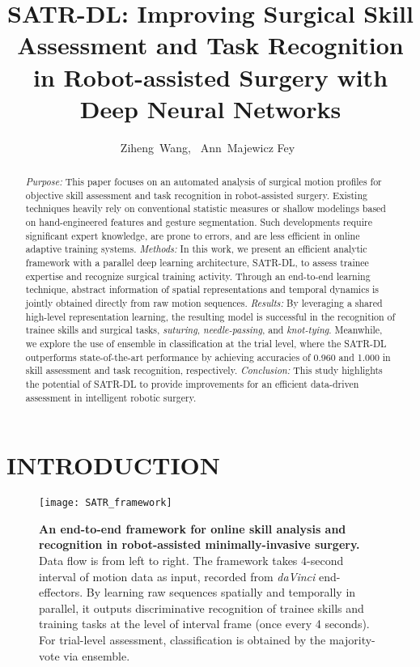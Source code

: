 \documentclass[letterpaper, 10 pt, conference, twoside]{IEEEtran}
\title{
SATR-DL: Improving Surgical Skill Assessment and Task Recognition in Robot-assisted Surgery with Deep Neural Networks
}
\author{Ziheng~Wang,~\IEEEmembership{Student Member, IEEE}
 Ann~Majewicz Fey~\IEEEmembership{Member, IEEE}
}%
\begin{document}
\maketitle

\begin{abstract}
\noindent \textit{Purpose:} 
This paper focuses on an automated analysis of surgical motion profiles for objective skill assessment and task recognition in robot-assisted surgery. Existing techniques heavily rely on conventional statistic measures or shallow modelings based on hand-engineered features and gesture segmentation. Such developments require significant expert knowledge, are prone to errors, and are less efficient in online adaptive training systems. 
\noindent \textit{Methods:} 
In this work, we present an efficient analytic framework with a parallel deep learning architecture, SATR-DL, to assess trainee expertise and recognize surgical training activity. Through an end-to-end learning technique, abstract information of spatial representations and temporal dynamics is jointly obtained directly from raw motion sequences. 
\noindent \textit{Results:} 
By leveraging a shared high-level representation learning, the resulting model is successful in the recognition of trainee skills and surgical tasks, \textit{suturing}, \textit{needle-passing}, and \textit{knot-tying}.
Meanwhile, we explore the use of ensemble in classification at the trial level, where the SATR-DL outperforms state-of-the-art performance by achieving accuracies of 0.960 and 1.000 in skill assessment and task recognition, respectively.  
\noindent \textit{Conclusion:} 
This study highlights the potential of SATR-DL to provide improvements for an efficient data-driven assessment in intelligent robotic surgery.
\end{abstract}


\section{INTRODUCTION}

 \begin{figure*}[!h]
      \centering
     \texttt{[image: SATR\_framework]}
	\caption{ {\bf An end-to-end framework for online skill analysis and recognition in robot-assisted minimally-invasive surgery.} Data flow is from left to right. The framework takes 4-second interval of motion data as input, recorded from \textit{daVinci} end-effectors. By learning raw sequences spatially and temporally in parallel, it outputs discriminative recognition of trainee skills and training tasks at the level of interval frame (once every 4 seconds). For trial-level assessment, classification is obtained by the majority-vote via ensemble.} 
      \label{fig: framework} 
     \vspace{-0.2cm}
\end{figure*}
\end{document}
